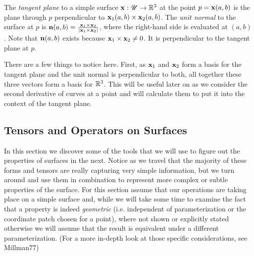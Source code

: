 

\begin{defn}
  The \emph{tangent plane} to a simple surface  $\mathbf{x}: \mathscr{U} \to \mathbb{R}^3$ at the point $p = \mathbf{x}(a, b)$ is the plane through $p$ perpendicular to $\mathbf{x}_1(a, b) \times \mathbf{x}_2(a, b)$. The \emph{unit normal} to the surface at $p$ is $\mathbf{n}(a, b) = \frac{\mathbf{x}_1 \times \mathbf{x}_2}{\left|\mathbf{x}_1 \times \mathbf{x}_2\right|}$, where the right-hand side is evaluated at $(a, b)$. Note that $\mathbf{n}(a, b)$ exists because $\mathbf{x}_1 \times \mathbf{x}_2 \neq 0$. It is perpendicular to the tangent plane at $p$.
\end{defn}

\begin{unno_rem}
  There are a few things to notice here. First, as $\mathbf{x}_1$ and $\mathbf{x}_2$ form a basis for the tangent plane and the unit normal is perpendicular to both, all together these three vectors form a basis for $\mathbb{R}^3$. This will be useful later on as we consider the second derivative of curves at a point and will calculate them to put it into the context of the tangent plane.
\end{unno_rem}

\subsection{Tensors and Operators on Surfaces}

In this section we discover some of the tools that we will use to figure out the properties of surfaces in the next. Notice as we travel that the majority of these forms and tensors are really capturing very simple information, but we turn around and use them in combination to represent more complex or subtle properties of the surface. For this section assume that our operations are taking place on a simple surface and, while we will take some time to examine the fact that a property is indeed \emph{geometric} (i.e. independent of parameterization or the coordinate patch chosen for a point), where not shown or explicitly stated otherwise we will assume that the result is equivalent under a different parameterization. (For a more in-depth look at those specific considerations, see Millman77)

